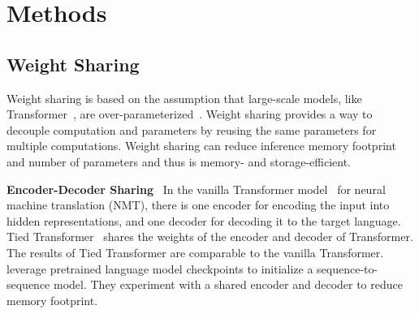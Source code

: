\documentclass[letterpaper]{article}
\newcommand{\paratitle}[1]{\noindent\textbf{#1}\ }
\begin{document}
\begin{table}[t]
    \centering
    \caption{A summary of various pruning methods. $\mathbf{S}$ are saliency scores used to determine which weights to prune. The table style is borrowed from \citet{sanh2020movement}.}
    \label{tab:prune}
\end{table}

\section{Methods}

\subsection{Weight Sharing}
Weight sharing is based on the assumption that large-scale models, like Transformer~\citep{transformer}, are over-parameterized~\citep{li2020train}. Weight sharing provides a way to decouple computation and parameters by reusing the same parameters for multiple computations. Weight sharing can reduce inference memory footprint and number of parameters and thus is memory- and storage-efficient.

\paratitle{Encoder-Decoder Sharing} In the vanilla Transformer model~\citep{transformer} for neural machine translation (NMT), there is one encoder for encoding the input into hidden representations, and one decoder for decoding it to the target language. Tied Transformer~\citep{xia2019tied} shares the weights of the encoder and decoder of Transformer. The results of Tied Transformer are comparable to the vanilla Transformer. \citet{rothe2020leveraging} leverage pretrained language model checkpoints to initialize a sequence-to-sequence model. They experiment with a shared encoder and decoder to reduce memory footprint.
\end{document}
